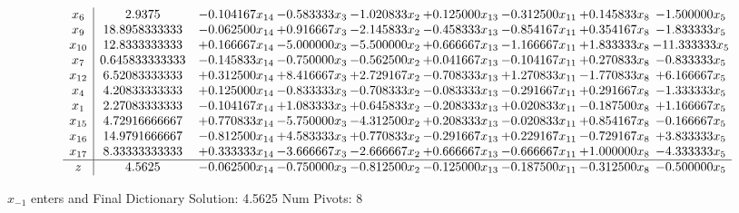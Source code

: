 \documentclass[10pt]{article}
\begin{document}
 \[\begin{array}{c| c c@{\hskip 2pt} c@{\hskip 2pt} c@{\hskip 2pt} c@{\hskip 2pt} c@{\hskip 2pt} c@{\hskip 2pt} c@{\hskip 2pt} }
 x_{6}   &  2.9375 & -0.104167 x_{14} & -0.583333 x_{3} & -1.020833 x_{2} & + 0.125000 x_{13} & -0.312500 x_{11} & + 0.145833 x_{8} & -1.500000 x_{5}\\
 x_{9}   &  18.8958333333 & -0.062500 x_{14} & + 0.916667 x_{3} & -2.145833 x_{2} & -0.458333 x_{13} & -0.854167 x_{11} & + 0.354167 x_{8} & -1.833333 x_{5}\\
 x_{10}   &  12.8333333333 & + 0.166667 x_{14} & -5.000000 x_{3} & -5.500000 x_{2} & + 0.666667 x_{13} & -1.166667 x_{11} & + 1.833333 x_{8} & -11.333333 x_{5}\\
 x_{7}   &  0.645833333333 & -0.145833 x_{14} & -0.750000 x_{3} & -0.562500 x_{2} & + 0.041667 x_{13} & -0.104167 x_{11} & + 0.270833 x_{8} & -0.833333 x_{5}\\
 x_{12}   &  6.52083333333 & + 0.312500 x_{14} & + 8.416667 x_{3} & + 2.729167 x_{2} & -0.708333 x_{13} & + 1.270833 x_{11} & -1.770833 x_{8} & + 6.166667 x_{5}\\
 x_{4}   &  4.20833333333 & + 0.125000 x_{14} & -0.833333 x_{3} & -0.708333 x_{2} & -0.083333 x_{13} & -0.291667 x_{11} & + 0.291667 x_{8} & -1.333333 x_{5}\\
 x_{1}   &  2.27083333333 & -0.104167 x_{14} & + 1.083333 x_{3} & + 0.645833 x_{2} & -0.208333 x_{13} & + 0.020833 x_{11} & -0.187500 x_{8} & + 1.166667 x_{5}\\
 x_{15}   &  4.72916666667 & + 0.770833 x_{14} & -5.750000 x_{3} & -4.312500 x_{2} & + 0.208333 x_{13} & -0.020833 x_{11} & + 0.854167 x_{8} & -0.166667 x_{5}\\
 x_{16}   &  14.9791666667 & -0.812500 x_{14} & + 4.583333 x_{3} & + 0.770833 x_{2} & -0.291667 x_{13} & + 0.229167 x_{11} & -0.729167 x_{8} & + 3.833333 x_{5}\\
 x_{17}   &  8.33333333333 & + 0.333333 x_{14} & -3.666667 x_{3} & -2.666667 x_{2} & + 0.666667 x_{13} & -0.666667 x_{11} & + 1.000000 x_{8} & -4.333333 x_{5}\\
\hline
z    &  4.5625 & -0.062500 x_{14} & -0.750000 x_{3} & -0.812500 x_{2} & -0.125000 x_{13} & -0.187500 x_{11} & -0.312500 x_{8} & -0.500000 x_{5}\\
\end{array}\]


 $ x_{-1} $ enters and Final Dictionary
Solution:  4.5625
Num Pivots:  8
\end{document}

